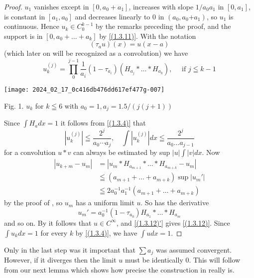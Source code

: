 \begin{proof}
    $u_{1}$ vanishes except in $\left[0, a_{0}+a_{1}\right]$, increases with slope $1 / a_{0} a_{1}$ in $\left[0, a_{1}\right]$, is constant in $\left[a_{1}, a_{0}\right]$ and decreases linearly to $0$ in $\left(a_{0}, a_{0}\right.\left.+a_{1}\right)$, so $u_{1}$ is continuous. Hence $u_{k} \in C_{0}^{k-1}$ by the remarks preceding the proof, and the support is in $\left[0, a_{0}+\ldots+a_{k}\right]$ by \eqref{(1.3.11)}. With the notation
\[
	\left(\tau_{a} u\right)(x)=u(x-a)
\]
(which later on will be recognized as a convolution) we have
\[
	u_{k}^{(j)}=\prod_{0}^{j-1} \frac{1}{a_{i}}\left(1-\tau_{a_{i}}\right)\left(H_{a_{j}} * \ldots * H_{a_{k}}\right), \quad \text { if } j \leqq k-1
\]

\begin{center}
	\texttt{[image: 2024\_02\_17\_0c416db476dd617ef477g-007]}

    Fig. 1. $u_{k}$ for $k \leqq 6$ with $a_{0}=1, a_{j}=1.5 /(j(j+1))$
\end{center}

Since $\int H_{a} d x=1$ it follows from \eqref{(1.3.4)} that
\begin{equation}
    \label{(1.3.12)'}
    \left|u_{k}^{(j)}\right| \leqq \frac{2^{j}}{a_{0} \cdots a_{j}}, \quad \int|u_{k}^{(j)}| d x \leqq \frac{2^{j}}{a_{0} \ldots a_{j-1}}
\end{equation}
for a convolution $u * v$ can always be estimated by sup $|u| \int|v| d x$. Now
\[
	\begin{aligned}
		\left|u_{k+m}-u_{m}\right| & =\left|u_{m} * H_{a_{m+1}} * \ldots * H_{a_{m+k}}-u_{m}\right|            \\
		                           & \leqq\left(a_{m+1}+\ldots+a_{m+k}\right) \sup \left|u_{m}'\right| \\
		                           & \leqq 2 a_{0}^{-1} a_{1}^{-1}\left(a_{m+1}+\ldots+a_{m+k}\right)
	\end{aligned}
\]
by the proof of , so $u_{m}$ has a uniform limit $u$. So has the derivative
\[
	u_{m}'=a_{0}^{-1}\left(1-\tau_{a_{0}}\right) H_{a_{1}} * \ldots * H_{a_{m}}
\]
and so on. By  it follows that $u \in C^{\infty}$, and \eqref{(1.3.12)'} gives \eqref{(1.3.12)}. Since $\int u_{k} d x=1$ for every $k$ by \eqref{(1.3.4)}, we have $\int u d x=1$.
\end{proof}

Only in the last step was it important that $\sum a_{j}$ was assumed convergent. However, if it diverges then the limit $u$ must be identically $0$. This will follow from our next lemma which shows how precise the construction in  really is.

